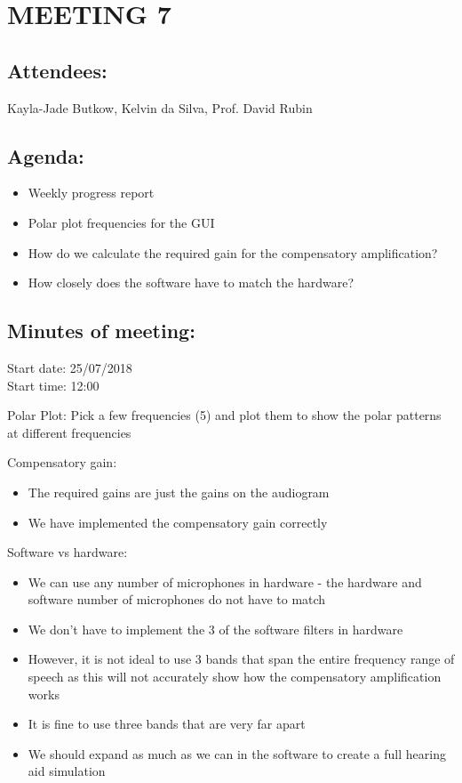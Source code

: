 \documentclass[10pt,onecolumn]{witseiepaper}
\begin{document}
\section*{MEETING 7}
\subsection*{Attendees:}
Kayla-Jade Butkow, Kelvin da Silva, Prof. David Rubin
\subsection*{Agenda:} 
\begin{itemize}
	\item Weekly progress report
	\item Polar plot frequencies for the GUI
	\item How do we calculate the required gain for the compensatory amplification?
	\item How closely does the software have to match the hardware?
\end{itemize}

\subsection*{Minutes of meeting:}
Start date: 25/07/2018 \\
Start time: 12:00

Polar Plot:
Pick a few frequencies (5) and plot them to show the polar patterns at different frequencies

Compensatory gain:
\begin{itemize}
	\item The required gains are just the gains on the audiogram
	\item We have implemented the compensatory gain correctly
\end{itemize}

Software vs hardware:
\begin{itemize}
	\item We can use any number of microphones in hardware - the hardware and software number of microphones do not have to match
	\item We don't have to implement the 3 of the software filters in hardware
	\item However, it is not ideal to use 3 bands that span the entire frequency range of speech as this will not accurately show how the compensatory amplification works
	\item It is fine to use three bands that are very far apart
	\item We should expand as much as we can in the software to create a full hearing aid simulation
\end{itemize}
\end{document}
